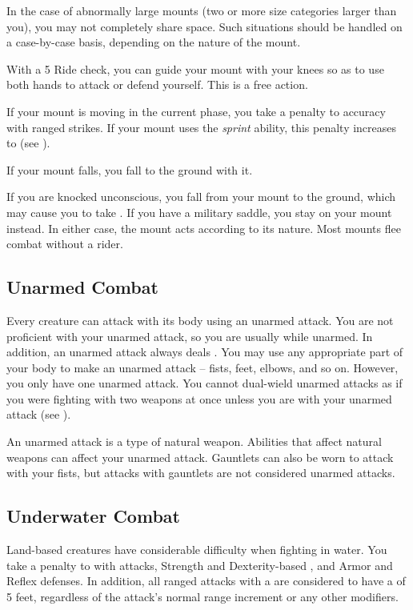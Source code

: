             In the case of abnormally large mounts (two or more size categories larger than you), you may not completely share space. Such situations should be handled on a case-by-case basis, depending on the nature of the mount.

             With a  5 Ride check, you can guide your mount with your knees so as to use both hands to attack or defend yourself. This is a free action.

            If your mount is moving in the current phase, you take a  penalty to accuracy with ranged strikes.
            If your mount uses the \textit{sprint} ability, this penalty increases to  (see ).

             If your mount falls, you fall to the ground with it.

             If you are knocked unconscious, you fall from your mount to the ground, which may cause you to take .
            If you have a military saddle, you stay on your mount instead.
            In either case, the mount acts according to its nature.
            Most mounts flee combat without a rider.

        \subsection{Unarmed Combat}\label{Unarmed Combat}
            Every creature can attack with its body using an unarmed attack.
            You are not proficient with your unarmed attack, so you are usually  while unarmed.
            In addition, an unarmed attack always deals .
            You may use any appropriate part of your body to make an unarmed attack -- fists, feet, elbows, and so on.
            However, you only have one unarmed attack.
            You cannot dual-wield unarmed attacks as if you were fighting with two weapons at once unless you are  with your unarmed attack (see ).

            An unarmed attack is a type of natural weapon.
            Abilities that affect natural weapons can affect your unarmed attack.
            Gauntlets can also be worn to attack with your fists, but attacks with gauntlets are not considered unarmed attacks.

        \subsection{Underwater Combat}\label{Underwater Combat}
            Land-based creatures have considerable difficulty when fighting in water.
            You take a  penalty to  with  attacks, Strength and Dexterity-based , and Armor and Reflex defenses.
            In addition, all ranged attacks with a  are considered to have a  of 5 feet, regardless of the attack's normal range increment or any other modifiers.


